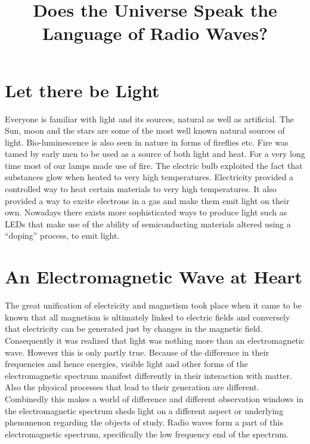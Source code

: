 \documentclass{../template/texnote}
\title{\textbf{Does the Universe Speak the Language of Radio Waves?}}[author={Linn Abraham}]
\begin{document}
    \maketitle {}
\section{Let there be Light}
Everyone is familiar with light and its sources, natural as well as artificial. The Sun, moon and the stars are some of the most well known natural sources of light. Bio-luminescence is also seen in nature in forms of fireflies etc. 
Fire was tamed by early men to be used as a source of both light and heat. For a very long time most of our lamps made use of fire. 
The electric bulb exploited the fact that substances glow when heated to very high temperatures.
Electricity provided a controlled way to heat certain materials to very high temperatures. It also provided a way to excite electrons in a gas and make them emit light on their own. 
Nowadays there exists more sophisticated ways to produce light such as LEDs that make use of the ability of semiconducting materials altered using a ``doping'' process, to emit light.

\section{An Electromagnetic Wave at Heart}
The great unification of electricity and magnetism took place when it came to be known that all magnetism is ultimately linked to electric fields and conversely that electricity can be generated just by changes in the magnetic field. Consequently it was realized that light was nothing more than an electromagnetic wave.
However this is only partly true. Because of the difference in their frequencies and hence energies, visible light and other forms of the electromagnetic spectrum manifest differently in their interaction with matter. 
Also the physical processes that lead to their generation are different. 
Combinedly this makes a world of difference and different observation windows in the electromagnetic spectrum sheds light on a different aspect or underlying phenomenon regarding the objects of study. 
Radio waves form a part of this electromagnetic spectrum, specifically the low frequency end of the spectrum.
\end{document}
